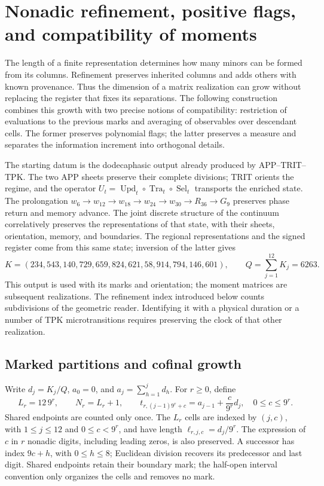 \section{Nonadic refinement, positive flags, and compatibility of moments}
\label{sec:dim-cofinal}

The length of a finite representation determines how many minors can be
formed from its columns. Refinement preserves inherited columns and
adds others with known provenance. Thus the dimension of a matrix
realization can grow without replacing the register that fixes its
separations. The following construction combines this growth with two
precise notions of compatibility: restriction of evaluations to the
previous marks and averaging of observables over descendant cells.
The former preserves polynomial flags; the latter preserves a
measure and separates the information increment into orthogonal details.

The starting datum is the dodecaphasic output already produced by
APP--TRIT--TPK. The two APP sheets preserve their complete divisions;
TRIT orients the regime, and the operator
\(U_t=\operatorname{Upd}_t\circ\operatorname{Tra}_t\circ
\operatorname{Sel}_t\) transports the enriched state. The prolongation
\(w_6\to w_{12}\to w_{18}\to w_{24}\to w_{30}\to R_{36}\to G_9\)
preserves phase return and memory advance. The joint discrete structure
of the continuum correlatively preserves the representations of that state,
with their sheets, orientation, memory, and boundaries. The regional
representations and the signed register come from this same state;
inversion of the latter gives
\[
 K=(234,543,140,729,659,824,621,58,914,794,146,601),
 \qquad Q=\sum_{j=1}^{12}K_j=6263.
\]
This output is used with its marks and orientation; the moment matrices
are subsequent realizations. The refinement index introduced below
counts subdivisions of the geometric reader. Identifying it with a
physical duration or a number of TPK microtransitions requires preserving
the clock of that other realization.

\subsection{Marked partitions and cofinal growth}

Write \(d_j=K_j/Q\), \(a_0=0\), and
\(a_j=\sum_{h=1}^j d_h\). For \(r\geq0\), define
\[
 L_r=12\,9^r,\qquad N_r=L_r+1,\qquad
 t_{r,(j-1)9^r+c}=a_{j-1}+\frac{c}{9^r}d_j,
 \quad 0\leq c\leq9^r.
\]
Shared endpoints are counted only once. The \(L_r\) cells are indexed
by \((j,c)\), with \(1\leq j\leq12\) and \(0\leq c<9^r\),
and have length \(\ell_{r,j,c}=d_j/9^r\). The expression of \(c\)
in \(r\) nonadic digits, including leading zeros, is also preserved.
A successor has index \(9c+h\), with \(0\leq h\leq8\); Euclidean
division recovers its predecessor and last digit. Shared endpoints retain
their boundary mark; the half-open interval convention only organizes
the cells and removes no mark.

